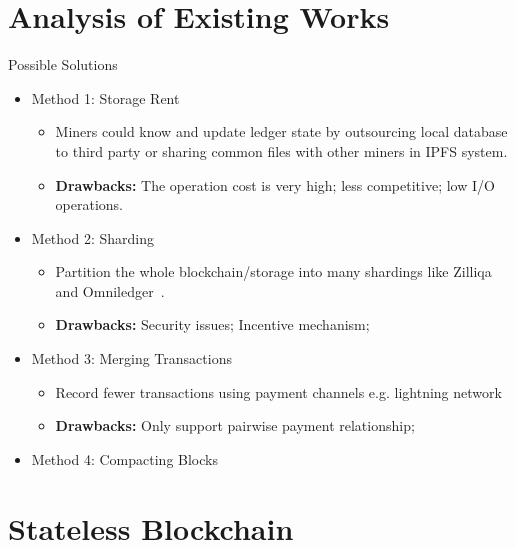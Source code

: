 \documentclass[biblatex,aspectratio=169,11pt]{mybeamer}
\begin{document}
\section{Analysis of Existing Works}

\begin{frame}{Possible Solutions}
  \begin{itemize}[<+->]
    \item Method 1: \alert{Storage Rent}
     \begin{itemize}[<+->]
       \item Miners could know and update ledger state by outsourcing local database to third party or sharing common files with other miners in IPFS system.
       \item \textbf{Drawbacks:} The operation cost is very high; less competitive; low I/O operations.
     \end{itemize}
     \item Method 2: \alert{Sharding}
      \begin{itemize}[<+->]
        \item Partition the whole blockchain/storage into many shardings like Zilliqa~\cite{zilliqa2017zilliqa} and Omniledger~\cite{kokoris2018omniledger}.
        \item \textbf{Drawbacks:} Security issues; Incentive mechanism;
      \end{itemize}
     \item Method 3: \alert{Merging Transactions} 
      \begin{itemize}[<+->]
        \item Record fewer transactions using payment channels e.g. lightning network~\cite{poon2016bitcoin}
        \item \textbf{Drawbacks:} Only support pairwise payment relationship;
      \end{itemize}
     \item Method 4: \alert{Compacting Blocks}~\cite{poelstra2016mimblewimble}
  \end{itemize}
\end{frame}


\section{Stateless Blockchain}
\end{document}
